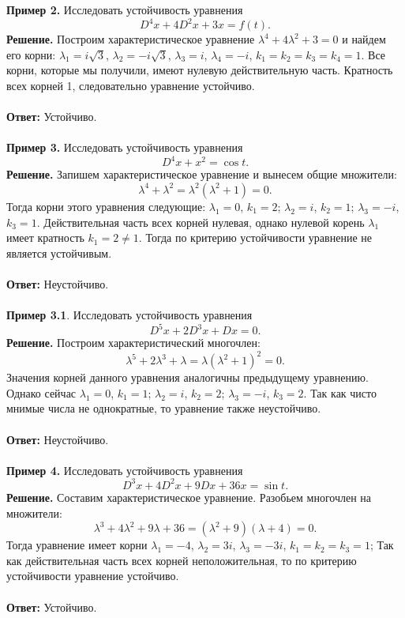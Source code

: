 \documentclass[a4paper, 12pt]{article}
\begin{document}
\textbf{Пример 2.} Исследовать устойчивость уравнения
$$D^4x + 4D^2x + 3x = f(t).$$
\textbf{Решение.} Построим характеристическое уравнение $\lambda^4 + 4\lambda^2 + 3 =0$ и найдем его корни: $\lambda_1 = i\sqrt{3}$, $\lambda_2 = -i\sqrt{3}$, $\lambda_3 = i$, $\lambda_4 = -i$, $k_1 = k_2 = k_3 = k_4 = 1$. Все корни, которые мы получили, имеют нулевую действительную часть. Кратность всех корней 1, следовательно уравнение устойчиво.\\\\
\textbf{Ответ:} Устойчиво.\\\\
\textbf{Пример 3.} Исследовать устойчивость уравнения
$$D^4x + x^2 = \cos t.$$
\textbf{Решение.} Запишем характеристическое уравнение и вынесем общие множители:
$$\lambda^4 + \lambda^2 = \lambda^2(\lambda^2 + 1) = 0.$$
Тогда корни этого уравнения следующие:
$\lambda_1 = 0$, $k_1 = 2$; $\lambda_2 = i$, $k_2 = 1$; $\lambda_3 = -i$, $k_3 = 1$. Действительная часть всех корней нулевая, однако нулевой корень $\lambda_1$ имеет кратность $k_1 = 2\ne 1$. Тогда по критерию устойчивости уравнение не является устойчивым.\\\\
\textbf{Ответ:} Неустойчиво.\\\\
\textbf{Пример 3.1}.  Исследовать устойчивость уравнения
$$D^5x + 2D^3x + Dx= 0.$$
\textbf{Решение.} Построим характеристический многочлен:
$$\lambda^5 + 2\lambda^3 + \lambda = \lambda(\lambda^2 + 1)^2 = 0.$$
Значения корней данного уравнения аналогичны предыдущему уравнению. Однако сейчас $\lambda_1 = 0$, $k_1 = 1$; $\lambda_2 = i$, $k_2 = 2$; $\lambda_3 = -i$, $k_3 = 2$. Так как чисто мнимые числа не однократные, то уравнение также неустойчиво.\\\\
\textbf{Ответ:} Неустойчиво.\\\\
\textbf{Пример 4.} Исследовать устойчивость уравнения
$$D^3x + 4D^2x + 9Dx + 36x = \sin t.$$
\textbf{Решение.} Составим характеристическое уравнение. Разобьем многочлен на множители:
$$\lambda^3 + 4\lambda^2 + 9\lambda + 36 = (\lambda^2 + 9)(\lambda + 4) = 0.$$
Тогда уравнение имеет корни $\lambda_1 = -4$, $\lambda_2 = 3i$, $\lambda_3 = -3i$,  $k_1 = k_2 = k_3 = 1$; Так как действительная часть всех корней неположительная, то по критерию устойчивости уравнение устойчиво.\\\\
\textbf{Ответ:} Устойчиво.
\end{document}
